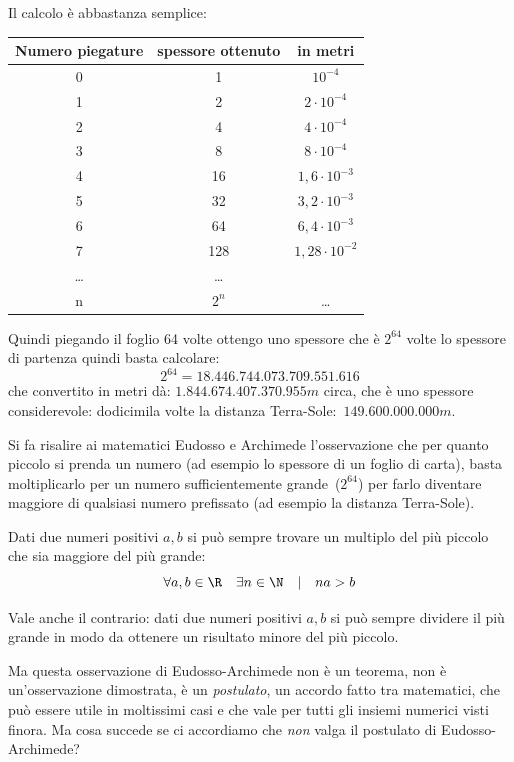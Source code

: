Il calcolo è abbastanza semplice:

\begin{center}
 \begin{tabular}{ccc}
\toprule
Numero piegature & spessore ottenuto & in metri\\
\midrule
0 & 1 & \(10^{-4}\)\\
1 & 2 & \(2 \cdot 10^{-4}\)\\
2 & 4 & \(4 \cdot 10^{-4}\)\\
3 & 8 & \(8 \cdot 10^{-4}\)\\
4 & 16 & \(1,6 \cdot 10^{-3}\)\\
5 & 32 & \(3,2 \cdot 10^{-3}\)\\
6 & 64 & \(6,4 \cdot 10^{-3}\)\\
7 & 128 & \(1,28 \cdot 10^{-2}\)\\
\ldots& \ldots\\
n & \(2^n\) & \ldots\\
\bottomrule
\end{tabular}
\end{center}

Quindi piegando il foglio 64 volte ottengo uno spessore che è \(2^{64}\) 
volte lo spessore di partenza quindi basta calcolare:
\[2^{64} = 18.446.744.073.709.551.616\]
che convertito in metri dà: \(1.844.674.407.370.955m\) circa, che è uno 
spessore considerevole: dodicimila volte la distanza 
Terra-Sole:~\(149.600.000.000m\).

Si fa risalire ai matematici Eudosso e Archimede l'osservazione che per 
quanto piccolo si prenda un numero (ad esempio lo spessore di un foglio di 
carta), basta moltiplicarlo per un numero sufficientemente 
grande~(\(2^{64}\)) per farlo diventare maggiore di qualsiasi numero 
prefissato (ad esempio la distanza Terra-Sole).

\begin{postulato}
Dati due numeri positivi \(a, b\) si può sempre trovare un 
multiplo del più piccolo che sia maggiore del più grande:
\[\forall a, b \in \R \quad \exists n \in \N \quad | \quad na>b\]
\end{postulato}

Vale anche il contrario: 
dati due numeri positivi \(a, b\) si può sempre dividere il più grande 
in modo da ottenere un risultato minore del più piccolo.

Ma questa osservazione di Eudosso-Archimede non è un teorema, non è 
un'osservazione dimostrata, è un \emph{postulato}, un accordo fatto tra 
matematici, che può essere utile in moltissimi casi e che vale per tutti gli 
insiemi numerici visti finora. 
Ma cosa succede se ci accordiamo che \emph{non} valga il postulato di 
Eudosso-Archimede?

